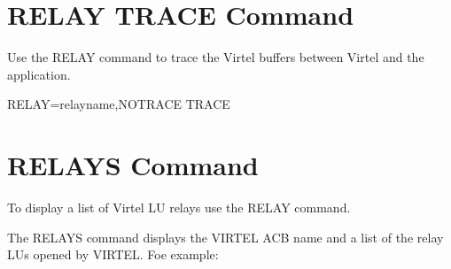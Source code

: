 \documentclass[letterpaper,10pt,english]{sphinxmanual}
\begin{document}
\section{RELAY TRACE Command}
\label{\detokenize{audit_operations_ and_performance:index-16}}\label{\detokenize{audit_operations_ and_performance:relay-trace-command}}
Use the RELAY command to trace the Virtel buffers between Virtel and the application.

RELAY=relayname,NOTRACE \textbar{} TRACE


\section{RELAYS Command}
\label{\detokenize{audit_operations_ and_performance:index-17}}\label{\detokenize{audit_operations_ and_performance:relays-command}}
To display a list of Virtel LU relays use the RELAY command.

\begin{sphinxVerbatim}[commandchars=\\\{\}]
\end{sphinxVerbatim}

The RELAYS command displays the VIRTEL ACB name and a list of the relay LUs opened by VIRTEL. Foe example:

\begin{sphinxVerbatim}[commandchars=\\\{\}]
 
 
       
         
    
     
  
   
\end{sphinxVerbatim}
\end{document}
